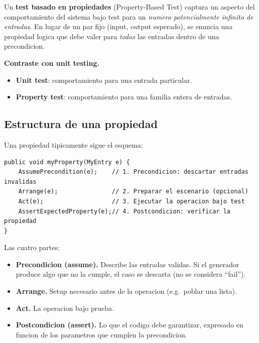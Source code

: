 \documentclass[12pt,a4paper]{article}
\begin{document}
\begin{definicionbox}
Un \textbf{test basado en propiedades} (Property-Based Test) captura un aspecto del
comportamiento del sistema bajo test para un \emph{numero potencialmente infinito de
entradas}. En lugar de un par fijo (input, output esperado), se enuncia una propiedad logica
que debe valer para \emph{todas} las entradas dentro de una precondicion.
\end{definicionbox}

\textbf{Contraste con unit testing.}

\begin{itemize}
  \item \textbf{Unit test}: comportamiento para una entrada particular.
  \item \textbf{Property test}: comportamiento para una familia entera de entradas.
\end{itemize}

\subsection{Estructura de una propiedad}

Una propiedad tipicamente sigue el esquema:

\begin{lstlisting}[style=codestyle]
public void myProperty(MyEntry e) {
    AssumePrecondition(e);    // 1. Precondicion: descartar entradas invalidas
    Arrange(e);               // 2. Preparar el escenario (opcional)
    Act(e);                   // 3. Ejecutar la operacion bajo test
    AssertExpectedProperty(e);// 4. Postcondicion: verificar la propiedad
}
\end{lstlisting}

Las cuatro partes:

\begin{itemize}
  \item \textbf{Precondicion (assume).} Describe las entradas validas. Si el generador produce
  algo que no la cumple, el caso se descarta (no se considera ``fail'').
  \item \textbf{Arrange.} Setup necesario antes de la operacion (e.g.\ poblar una lista).
  \item \textbf{Act.} La operacion bajo prueba.
  \item \textbf{Postcondicion (assert).} Lo que el codigo debe garantizar, expresado en
  funcion de los parametros que cumplen la precondicion.
\end{itemize}
\end{document}

